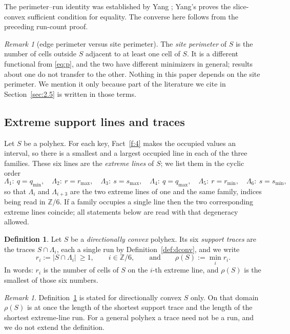 \documentclass[11pt]{article}
\theoremstyle{plain}
\theoremstyle{definition}
\newtheorem{definition}[theorem]{Definition}
\theoremstyle{remark}
\newtheorem{remark}[theorem]{Remark}
\newcommand{\Z}{\mathbb{Z}}
\begin{document}
\noindent The perimeter--run identity was established by Yang
\cite[Theorem~4]{Yang2002}; Yang's \cite[Theorem~5]{Yang2002} proves the
slice-convex sufficient condition for equality. The converse here follows
from the preceding run-count proof.

\begin{remark}[edge perimeter versus site perimeter]\label{rem:site}
The \emph{site perimeter} of \(S\) is the number of cells outside \(S\) adjacent to at
least one cell of \(S\). It is a different functional from \eqref{eq:p}, and the two have
different minimizers in general; results about one do not transfer to the other. Nothing
in this paper depends on the site perimeter. We mention it only because part of the
literature we cite in Section~\ref{sec:2.5} is written in those terms.
\end{remark}

\subsection{Extreme support lines and traces}\label{sec:2.3}

Let \(S\) be a polyhex. For each key, Fact~\ref{f:4} makes the occupied values an interval,
so there is a smallest and a largest occupied line in each of the three families. These six
lines are the \emph{extreme lines} of \(S\); we list them in the cyclic order
\[
   \Lambda_{1}:\ q=q_{\min},\quad
   \Lambda_{2}:\ r=r_{\max},\quad
   \Lambda_{3}:\ s=s_{\max},\quad
   \Lambda_{4}:\ q=q_{\max},\quad
   \Lambda_{5}:\ r=r_{\min},\quad
   \Lambda_{6}:\ s=s_{\min},
\]
so that \(\Lambda_{i}\) and \(\Lambda_{i+3}\) are the two extreme lines of one and the same
family, indices being read in \(\Z/6\). If a family occupies a single line then the two
corresponding extreme lines coincide; all statements below are read with that degeneracy
allowed.

\begin{definition}\label{def:traces}
Let \(S\) be a \emph{directionally convex} polyhex. Its six \emph{support traces} are the
traces \(S\cap\Lambda_{i}\), each a single run by Definition~\ref{def:dconv}, and we write
\[
   r_{i}:=|S\cap\Lambda_{i}|\ \ge 1 ,\qquad i\in\Z/6,
   \qquad\text{and}\qquad
   \rho(S):=\min_{i} r_{i} .
\]
In words: \(r_{i}\) is the number of cells of \(S\) on the \(i\)-th extreme line, and
\(\rho(S)\) is the smallest of those six numbers.
\end{definition}

\begin{remark}\label{rem:rho}
Definition~\ref{def:traces} is stated for directionally convex \(S\) only. On that domain \(\rho(S)\) is at once the length of the shortest support trace and the
length of the shortest extreme-line run. For
a general polyhex a trace need not be a run, and we do not extend the definition.
\end{remark}
\end{document}
